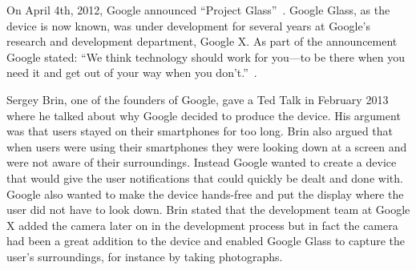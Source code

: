 %
%
%
%
%
%
%
%
On April 4th, 2012, Google announced ``Project Glass''~\cite{GoogleGlassConcept}. Google Glass, as the device is now known, was under development for several years at Google's research and development department, Google X. As part of the announcement Google stated:  ``We think technology should work for you---to be there when you need it and get out of your way when you don't.''~\cite{GoogleGlassAnnouncement}.

Sergey Brin, one of the founders of Google, gave a Ted Talk in February 2013~\cite{tedtalkWhyGlass} where he talked about why Google decided to produce the device. His argument was that users stayed on their smartphones for too long. Brin also argued that when users were using their smartphones they were looking down at a screen and were not aware of their surroundings. Instead Google wanted to create a device that would give the user notifications that could quickly be dealt and done with. Google also wanted to make the device hands-free and put the display where the user did not have to look down. Brin stated that the development team at Google X added the camera later on in the development process but in fact the camera had been a great addition to the device and enabled Google Glass to capture the user's surroundings, for instance by taking photographs.

